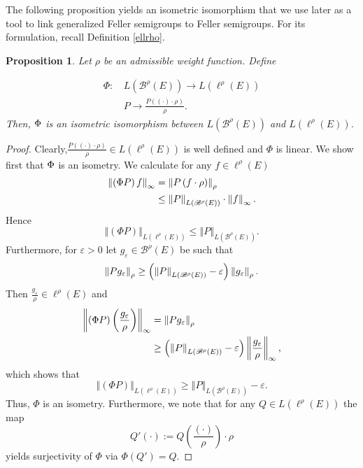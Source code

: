 \documentclass[a4paper,12pt]{article}
\newtheorem{proposition}[theorem]{Proposition}
\theoremstyle{definition}
\theoremstyle{remark}
\numberwithin{equation}{section}
\numberwithin{theorem}{section}
\begin{document}
The following proposition yields an isometric isomorphism that we  use later as a tool to link generalized Feller semigroups to Feller semigroups. For its formulation, recall Definition \ref{ellrho}.


\begin{proposition}
\label{prop:Isometry between Feller and gFs} Let $\rho$ be an admissible
weight function. Define

\begin{align*}
\Phi:\, & L(\mathcal{\mathscr{B}}^{\rho}(E))\rightarrow L(\ell^{\rho}(E))\\
&P \rightarrow\frac{P\left(\left(\cdot\right)\cdot\rho\right)}{\rho}.
\end{align*}
Then, 
$\text{\ensuremath{\Phi}}$
is an isometric isomorphism between $L(\mathcal{\mathscr{B}}^{\rho}(E))$
and $L(\ell^{\rho}(E))$.
\end{proposition}

\begin{proof}
Clearly,$\frac{P\left(\left(\cdot\right)\cdot\rho\right)}{\rho}\in L(\ell^{\rho}(E))$
is well defined and $\Phi$ is linear.
We show first that $\text{\ensuremath{\Phi}}$ is an isometry. 
We calculate for any $f \in \ell^{\rho}(E)$
\begin{align*}
\left\Vert \left(\Phi P\right)f\right\Vert _{\infty} & =\left\Vert P\left(f\cdot\rho\right)\right\Vert _{\text{\ensuremath{\rho}}}\\
 & \leq\left\Vert P\right\Vert _{L\left(\mathscr{B}^{\rho}(E)\right)}\cdot\left\Vert f\right\Vert _{\infty}.
\end{align*}
Hence 
\[
\left\Vert \left(\Phi P\right)\right\Vert _{L(\ell^{\rho}(E))}\leq\left\Vert P\right\Vert _{L\left(\mathscr{B}^{\rho}(E)\right)}.
\]
 Furthermore, for $\varepsilon>0$ let $g_{\varepsilon}\in\mathscr{B}^{\rho}(E)$
be such that 
\[
\left\Vert Pg_{\varepsilon}\right\Vert _{\text{\ensuremath{\rho}}}\geq\left(\left\Vert P\right\Vert _{L\left(\mathscr{B}^{\rho}(E)\right)}-\varepsilon\right)\left\Vert g_{\varepsilon}\right\Vert _{\text{\ensuremath{\rho}}}.
\]
Then  $\frac{g_{\varepsilon}}{\rho}\in\ell^{\rho}(E)$
and 
\begin{align*}
\left\Vert (\Phi P)\left(\frac{g_{\varepsilon}}{\rho}\right)\right\Vert _{\infty}
 & =\left\Vert Pg_{\varepsilon}\right\Vert _{\rho}\\
 & \geq\left(\left\Vert P\right\Vert _{L(\mathcal{\mathscr{B}}^{\rho}(E))}-\varepsilon\right)\left\Vert \frac{g_{\varepsilon}}{\rho}\right\Vert _{\text{\ensuremath{\infty}}},
\end{align*}
which shows that
\[
\left\Vert \left(\Phi P\right)\right\Vert _{L(\ell^{\rho}(E))}\geq\left\Vert P\right\Vert _{L\left(\mathscr{B}^{\rho}(E)\right)}-\varepsilon.
\]
Thus, $\Phi$ is an isometry. 
Furthermore, we note that for any $Q\in L(\ell^{\rho}(E))$ the map
\[
Q'(\cdot):=Q\left(\frac{(\cdot)}{\rho}\right)\cdot\rho
\]
yields surjectivity of $\Phi$ via  $\Phi\left(Q'\right)=Q$.

\end{proof}
\end{document}
